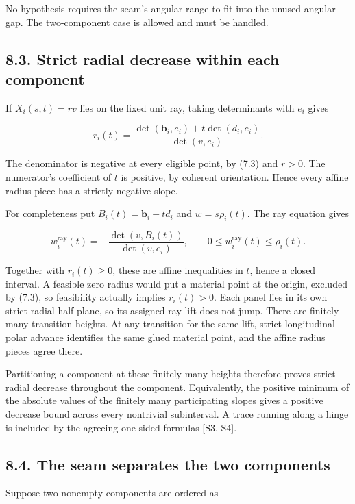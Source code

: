 \documentclass[
  11pt,
  letterpaper,
]{article}
\begin{document}
No hypothesis requires the seam's angular range to fit into the unused
angular gap. The two-component case is allowed and must be handled.

\subsection{8.3. Strict radial decrease within each
component}\label{strict-radial-decrease-within-each-component}

If \(X_i(s,t)=r v\) lies on the fixed unit ray, taking determinants with
\(e_i\) gives

\[
r_i(t)=\frac{\det(\mathbf b_i,e_i)+t\det(d_i,e_i)}{\det(v,e_i)}.
\tag{8.5}
\]

The denominator is negative at every eligible point, by (7.3) and
\(r>0\). The numerator's coefficient of \(t\) is positive, by coherent
orientation. Hence every affine radius piece has a strictly negative
slope.

For completeness put \(B_i(t)=\mathbf b_i+td_i\) and \(w=s\rho_i(t)\).
The ray equation gives

\[
w_i^{\mathrm{ray}}(t)=-\frac{\det(v,B_i(t))}{\det(v,e_i)},
\qquad 0\le w_i^{\mathrm{ray}}(t)\le\rho_i(t).
\]

Together with \(r_i(t)\ge0\), these are affine inequalities in \(t\),
hence a closed interval. A feasible zero radius would put a material
point at the origin, excluded by (7.3), so feasibility actually implies
\(r_i(t)>0\). Each panel lies in its own strict radial half-plane, so
its assigned ray lift does not jump. There are finitely many transition
heights. At any transition for the same lift, strict longitudinal polar
advance identifies the same glued material point, and the affine radius
pieces agree there.

Partitioning a component at these finitely many heights therefore proves
strict radial decrease throughout the component. Equivalently, the
positive minimum of the absolute values of the finitely many
participating slopes gives a positive decrease bound across every
nontrivial subinterval. A trace running along a hinge is included by the
agreeing one-sided formulas {[}S3, S4{]}.

\subsection{8.4. The seam separates the two
components}\label{the-seam-separates-the-two-components}

Suppose two nonempty components are ordered as
\end{document}
